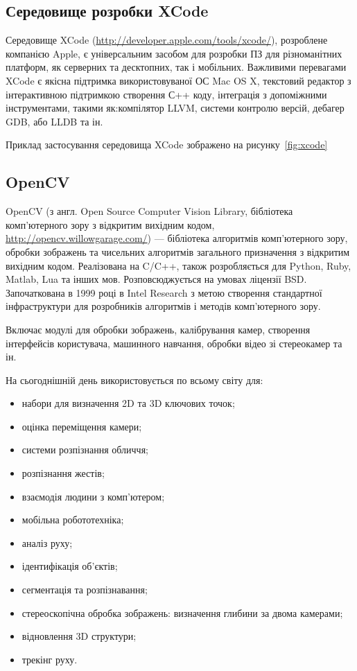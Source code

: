 \subsection{Середовище розробки XCode}
Середовище XCode (\url{http://developer.apple.com/tools/xcode/}), розроблене компанією Apple, є універсальним засобом для розробки ПЗ для різноманітних платформ, як серверних та десктопних, так і мобільних. Важливими перевагами XCode є якісна підтримка використовуваної ОС Mac OS X, текстовий редактор з інтерактивною підтримкою створення С++ коду, інтеграція з допоміжними інструментами, такими як:компілятор LLVM, системи контролю версій, дебагер GDB, або LLDB та ін. 

Приклад застосування середовища XCode зображено на рисунку~\ref{fig:xcode}


\subsection{OpenCV}
\label{sec:opencv}
OpenCV (з англ. Open Source Computer Vision Library, бібліотека комп'ютерного зору з відкритим вихідним кодом, \url{http://opencv.willowgarage.com/}) — бібліотека алгоритмів комп'ютерного зору, обробки зображень та чисельних алгоритмів загального призначення з відкритим вихідним кодом. Реалізована на C/C++, також розробляється для Python, Ruby, Matlab, Lua та інших мов. Розповсюджується на умовах ліцензії BSD. Започаткована в 1999 році в Intel Research з метою створення стандартної інфраструктури для розробників алгоритмів і методів комп'ютерного зору.

Включає модулі для обробки зображень, калібрування камер, створення інтерфейсів користувача, машинного навчання, обробки відео зі стереокамер та ін.

На сьогоднішній день використовується по всьому світу для:

\begin{itemize}
    \item набори для визначення 2D та 3D ключових точок;
    \item оцінка переміщення камери;
    \item системи розпізнання обличчя;
    \item розпізнання жестів;
    \item взаємодія людини з комп'ютером;
    \item мобільна робототехніка;
    \item аналіз руху;
    \item ідентифікація об'єктів;
    \item сегментація та розпізнавання;
    \item стереоскопічна обробка зображень: визначення глибини за двома камерами;
    \item відновлення 3D структури;
    \item трекінг руху.
\end{itemize}

